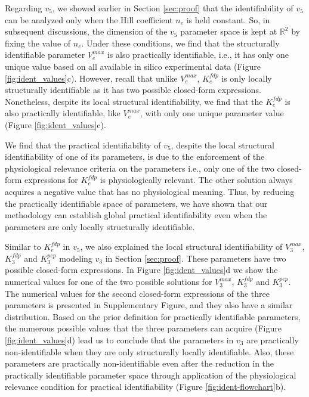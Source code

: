 \documentclass[10pt]{article}
\begin{document}
	Regarding $v_5$, we showed earlier in Section \ref{sec:proof} that the identifiability of $v_5$ can be analyzed only when the Hill coefficient $n_e$ is held constant. So, in subsequent discussions, the dimension of the $v_5$ parameter space is kept at $\mathbb{R}^2$ by fixing the value of $n_e$. Under these conditions, we find that the structurally identifiable parameter $V_e^{max}$ is also practically identifiable, i.e., it has only one unique value based on all available in silico experimental data (Figure \ref{fig:ident_values}c). However, recall that unlike $V_e^{max}$, $K_e^{fdp}$ is only locally structurally identifiable as it has two possible closed-form expressions. Nonetheless, despite its local structural identifiability, we find that the $K_e^{fdp}$ is also practically identifiable, like $V_e^{max}$, with only one unique parameter value (Figure \ref{fig:ident_values}c).
	
	We find that the practical identifiability of $v_5$, despite the local structural identifiability of one of its parameters, is due to the enforcement of the physiological relevance criteria on the parameters i.e., only one of the two closed-form expressions for $K_e^{fdp}$ is physiologically relevant. The other solution always acquires a negative value that has no physiological meaning. Thus, by reducing the practically identifiable space of parameters, we have shown that our methodology can establish global practical identifiability even when the parameters are only locally structurally identifiable. 
	
	Similar to $K_e^{fdp}$ in $v_5$, we also explained the local structural identifiability of $V_3^{max}$, $K_3^{fdp}$ and $K_3^{pep}$ modeling $v_3$ in Section \ref{sec:proof}. These parameters have two possible closed-form expressions. In Figure \ref{fig:ident_values}d we show the numerical values for one of the two possible solutions for $V_3^{max}$, $K_3^{fdp}$ and $K_3^{pep}$. The numerical values for the second closed-form expressions of the three parameters is presented in Supplementary Figure, and they also have a similar distribution. Based on the prior definition for practically identifiable parameters, the numerous possible values that the three parameters can acquire (Figure \ref{fig:ident_values}d) lead us to conclude that the parameters in $v_3$ are practically non-identifiable when they are only structurally locally identifiable. Also, these parameters are practically non-identifiable even after the reduction in the practically identifiable parameter space through application of the physiological relevance condition for practical identifiability (Figure \ref{fig:ident-flowchart}b). 	
	
\end{document}
